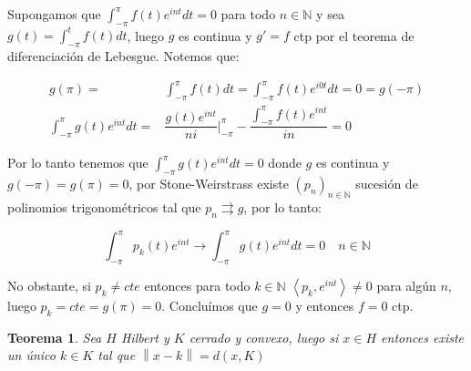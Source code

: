 \documentclass[11pt]{article}
\newcommand{\N}{{\mathbb{N}}}
\newcommand{\norm}[1]{\left\lVert#1\right\rVert}
\newcommand{\ip}[1]{\left\langle#1\right\rangle}
\newtheorem{theorem}{Teorema}
\numberwithin{theorem}{subsection}
\newenvironment{proof}[1][Demostraci\'on]{\begin{trivlist}
		\item[\hskip \labelsep {\bfseries #1}]}{\end{trivlist}}
\newcommand{\qed}{\nobreak \ifvmode \relax \else
	\ifdim\lastskip<1.5em \hskip-\lastskip
	\hskip1.5em plus0em minus0.5em \fi \nobreak
	\vrule height0.75em width0.5em depth0.25em\fi}
\begin{document}
\begin{proof}
	Supongamos que $\int_{-\pi}^{\pi}{f(t)e^{int} dt} = 0$ para todo $n \in \N$ y sea $g(t) = \int_{-\pi}^{t}{f(t) dt}$, luego $g$ es continua y $g' = f$ ctp por el teorema de diferenciaci\'on de Lebesgue. Notemos que:
	
	\[
	\begin{aligned}
		g(\pi) = & \int_{-\pi}^{\pi}{f(t) dt} = \int_{-\pi}^{\pi}{f(t) e^{i0t}dt} = 0 = g(-\pi) \\
		\int_{-\pi}^{\pi}{g(t) e^{int} dt} = & \dfrac{g(t)e^{int}}{ni} \vert_{-\pi}^{\pi} - \dfrac{\int_{-\pi}^{\pi}{f(t)e^{int}}}{in} = 0
	\end{aligned}	
	\]
	
	Por lo tanto tenemos que $\int_{-\pi}^{\pi}{g(t)e^{int}dt} = 0$ donde $g$ es continua y $g(-\pi) = g(\pi) = 0$, por Stone-Weirstrass existe $(p_n)_{n \in \N}$ sucesi\'on de polinomios trigonom\'etricos tal que $p_n \rightrightarrows g$, por lo tanto:
	
	\begin{equation*}
		\int_{-\pi}^{\pi}{p_k(t)e^{int}} \rightarrow \int_{-\pi}^{\pi}{g(t)e^{int}dt} = 0 \quad n \in \N
	\end{equation*}
	
	No obstante, si $p_k \neq cte$ entonces para todo $k \in \N$ $\ip{p_k,e^{int}} \neq 0$ para alg\'un $n$, luego $p_k = cte = g(\pi) = 0$. Conclu\'imos que $g = 0$ y entonces $f = 0$ ctp. \qed
	
\end{proof}

\begin{theorem}
	\label{Proyeccion unica en un cerrado convexo}
	Sea $H$ Hilbert y $K$ cerrado y convexo, luego si $x \in H$ entonces existe un \'unico $k \in K$ tal que $\norm{x-k} = d(x,K)$
\end{theorem}
\end{document}
